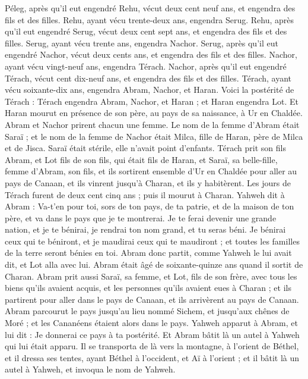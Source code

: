 \begin{multicols}{2}
Péleg, après qu'il eut engendré Rehu, vécut deux cent neuf ans, et engendra des fils et des filles.
Rehu, ayant vécu trente-deux ans, engendra Serug.
Rehu, après qu'il eut engendré Serug, vécut deux cent sept ans, et engendra des fils et des filles.
Serug, ayant vécu trente ans, engendra Nachor.
Serug, après qu'il eut engendré Nachor, vécut deux cents ans, et engendra des fils et des filles.
Nachor, ayant vécu vingt-neuf ans, engendra Térach.
Nachor, après qu'il eut engendré Térach, vécut cent dix-neuf ans, et engendra des fils et des filles.
Térach, ayant vécu soixante-dix ans, engendra Abram, Nachor, et Haran.
Voici la postérité de Térach : Térach engendra Abram, Nachor, et Haran ; et Haran engendra Lot.
Et Haran mourut en présence de son père, au pays de sa naissance, à Ur en Chaldée.
Abram et Nachor prirent chacun une femme. Le nom de la femme d'Abram était Saraï ; et le nom de la femme de Nachor était Milca, fille de Haran, père de Milca et de Jisca.
Saraï était stérile, elle n'avait point d'enfants.
Térach prit son fils Abram, et Lot fils de son fils, qui était fils de Haran, et Saraï, sa belle-fille, femme d'Abram, son fils, et ils sortirent ensemble d'Ur en Chaldée pour aller au pays de Canaan, et ils vinrent jusqu'à Charan, et ils y habitèrent.
Les jours de Térach furent de deux cent cinq ans ; puis il mourut à Charan.
\VerseOne{}Yahweh dit à Abram : Va-t'en pour toi, sors de ton pays, de ta patrie, et de la maison de ton père, et va dans le pays que je te montrerai.
Je te ferai devenir une grande nation, et je te bénirai, je rendrai ton nom grand, et tu seras béni.
Je bénirai ceux qui te béniront, et je maudirai ceux qui te maudiront ; et toutes les familles de la terre seront bénies en toi.
Abram donc partit, comme Yahweh le lui avait dit, et Lot alla avec lui. Abram était âgé de soixante-quinze ans quand il sortit de Charan.
Abram prit aussi Saraï, sa femme, et Lot, fils de son frère, avec tous les biens qu'ils avaient acquis, et les personnes qu'ils avaient eues à Charan ; et ils partirent pour aller dans le pays de Canaan, et ils arrivèrent au pays de Canaan.
Abram parcourut le pays jusqu'au lieu nommé Sichem, et jusqu'aux chênes de Moré ; et les Cananéens étaient alors dans le pays.
Yahweh apparut à Abram, et lui dit : Je donnerai ce pays à ta postérité. Et Abram bâtit là un autel à Yahweh qui lui était apparu.
Il se transporta de là vers la montagne, à l'orient de Béthel, et il dressa ses tentes, ayant Béthel à l'occident, et Aï à l'orient ; et il bâtit là un autel à Yahweh, et invoqua le nom de Yahweh.

\end{multicols}
